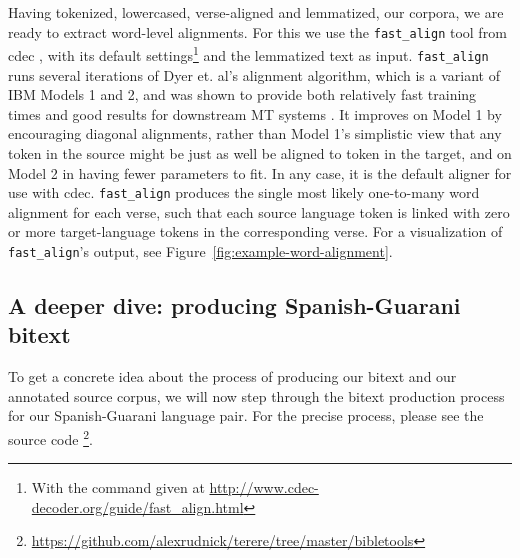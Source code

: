 Having tokenized, lowercased, verse-aligned and lemmatized, our corpora, we are
ready to extract word-level alignments.  For this we use the
\texttt{fast\_align} tool from cdec \cite{dyer-EtAl:2010:Demos}, with its
default settings\footnote{With the command given at
\url{http://www.cdec-decoder.org/guide/fast_align.html}} and the lemmatized
text as input.  \texttt{fast\_align} runs several iterations of Dyer et. al's
alignment algorithm, which is a variant of IBM Models 1 and 2, and was shown to
provide both relatively fast training times and good results for downstream MT
systems \cite{dyer-chahuneau-smith:2013:NAACL-HLT}. It improves on Model 1 by
encouraging diagonal alignments, rather than Model 1's simplistic view that any
token in the source might be just as well be aligned to token in the target,
and on Model 2 in having fewer parameters to fit. In any case, it is the
default aligner for use with cdec. \texttt{fast\_align} produces the single most
likely one-to-many word alignment for each verse, such that each source
language token is linked with zero or more target-language tokens in the
corresponding verse. For a visualization of \texttt{fast\_align}'s output, see
Figure~\ref{fig:example-word-alignment}.

\begin{figure*}
  \caption{A sample word alignment. The beginning of Lamentations 1:2, mapping
  from Spanish to Guarani. Alignment produced with \texttt{fast\_align}.}
  \label{fig:example-word-alignment}
\end{figure*}

\subsection{A deeper dive: producing Spanish-Guarani bitext}
To get a concrete idea about the process of producing our bitext and our
annotated source corpus, we will now step through the bitext production process
for our Spanish-Guarani language pair. For the precise process, please see the
source code
\footnote{\url{https://github.com/alexrudnick/terere/tree/master/bibletools}}.

